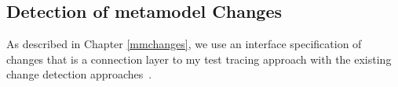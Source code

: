 \subsection{Detection of metamodel Changes}\label{sec:changes}



As described in Chapter \ref{mmchanges}, we use an interface specification of changes {\small{}} that is a connection layer to my test tracing approach with the existing change detection approaches~\cite{Alter2015, williams2012searching,cicchetti_managing_2009,langer_posteriori_2013,vermolen_reconstructing_2012,Khelladi2016}.

